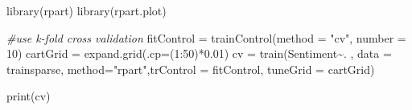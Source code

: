 \documentclass[
]{article}
\newenvironment{Shaded}{\begin{snugshade}}{\end{snugshade}}
\newcommand{\AttributeTok}[1]{\textcolor[rgb]{0.77,0.63,0.00}{#1}}
\newcommand{\CommentTok}[1]{\textcolor[rgb]{0.56,0.35,0.01}{\textit{#1}}}
\newcommand{\DecValTok}[1]{\textcolor[rgb]{0.00,0.00,0.81}{#1}}
\newcommand{\FloatTok}[1]{\textcolor[rgb]{0.00,0.00,0.81}{#1}}
\newcommand{\FunctionTok}[1]{\textcolor[rgb]{0.00,0.00,0.00}{#1}}
\newcommand{\NormalTok}[1]{#1}
\newcommand{\OtherTok}[1]{\textcolor[rgb]{0.56,0.35,0.01}{#1}}
\newcommand{\SpecialCharTok}[1]{\textcolor[rgb]{0.00,0.00,0.00}{#1}}
\newcommand{\StringTok}[1]{\textcolor[rgb]{0.31,0.60,0.02}{#1}}
\begin{document}
\begin{Shaded}
\begin{Highlighting}[]
\FunctionTok{library}\NormalTok{(rpart)}
\FunctionTok{library}\NormalTok{(rpart.plot)}

\CommentTok{\#use k{-}fold cross validation}
\NormalTok{fitControl }\OtherTok{=} \FunctionTok{trainControl}\NormalTok{(}\AttributeTok{method =} \StringTok{"cv"}\NormalTok{, }\AttributeTok{number =} \DecValTok{10}\NormalTok{)}
\NormalTok{cartGrid }\OtherTok{=} \FunctionTok{expand.grid}\NormalTok{(}\AttributeTok{.cp=}\NormalTok{(}\DecValTok{1}\SpecialCharTok{:}\DecValTok{50}\NormalTok{)}\SpecialCharTok{*}\FloatTok{0.01}\NormalTok{)}
\NormalTok{cv }\OtherTok{=} \FunctionTok{train}\NormalTok{(Sentiment}\SpecialCharTok{\textasciitilde{}}\NormalTok{. , }\AttributeTok{data =}\NormalTok{ trainsparse, }\AttributeTok{method=}\StringTok{"rpart"}\NormalTok{,}\AttributeTok{trControl =}\NormalTok{ fitControl, }\AttributeTok{tuneGrid =}\NormalTok{ cartGrid)}

\FunctionTok{print}\NormalTok{(cv)}
\end{Highlighting}
\end{Shaded}
\end{document}
